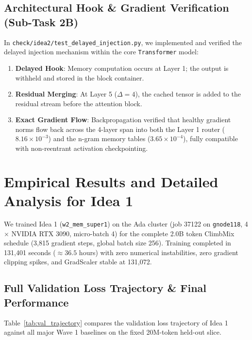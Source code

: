 \documentclass[11pt,a4paper]{article}
\begin{document}
\subsection{Architectural Hook \& Gradient Verification (Sub-Task 2B)}
In \texttt{check/idea2/test\_delayed\_injection.py}, we implemented and verified the delayed injection mechanism within the core \texttt{Transformer} model:
\begin{enumerate}[leftmargin=1.4em, itemsep=2pt]
    \item \textbf{Delayed Hook}: Memory computation occurs at Layer 1; the output is withheld and stored in the block container.
    \item \textbf{Residual Merging}: At Layer 5 ($\Delta = 4$), the cached tensor is added to the residual stream before the attention block.
    \item \textbf{Exact Gradient Flow}: Backpropagation verified that healthy gradient norms flow back across the 4-layer span into both the Layer 1 router ($8.16 \times 10^{-3}$) and the n-gram memory tables ($3.65 \times 10^{-4}$), fully compatible with non-reentrant activation checkpointing.
\end{enumerate}

\vspace{0.5em}

\section{Empirical Results and Detailed Analysis for Idea 1}
\label{sec:results}

We trained Idea 1 (\texttt{w2\_mem\_super1}) on the Ada cluster (job 37122 on \texttt{gnode118}, 4$\times$ NVIDIA RTX 3090, micro-batch 4) for the complete 2.0B token ClimbMix schedule (3,815 gradient steps, global batch size 256). Training completed in 131,401 seconds ($\approx 36.5$ hours) with zero numerical instabilities, zero gradient clipping spikes, and GradScaler stable at 131,072.

\subsection{Full Validation Loss Trajectory \& Final Performance}
Table~\ref{tab:val_trajectory} compares the validation loss trajectory of Idea 1 against all major Wave 1 baselines on the fixed 20M-token held-out slice.
\end{document}
